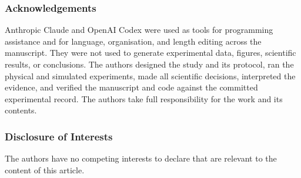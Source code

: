 \begin{credits}
\subsubsection{Acknowledgements}
Anthropic Claude and OpenAI Codex were used as tools for programming
assistance and for language, organisation, and length editing across the
manuscript. They were not used to generate experimental data, figures,
scientific results, or conclusions. The authors designed the study and its
protocol, ran the physical and simulated experiments, made all scientific
decisions, interpreted the evidence, and verified the manuscript and code
against the committed experimental record. The authors take full
responsibility for the work and its contents.

\subsubsection{Disclosure of Interests}
The authors have no competing interests to declare that are relevant to the
content of this article.
\end{credits}
